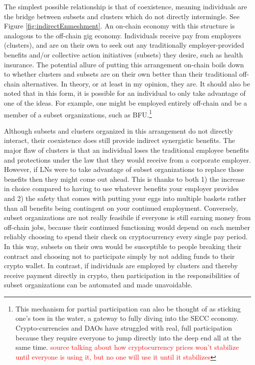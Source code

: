 \documentclass{article}[10pt]
\begin{document}
The simplest possible relationship is that of coexistence, meaning individuals are the bridge between subsets and clusters which do not directly intermingle. 
See Figure \ref{fig:indirectEnmeshment}. 
An on-chain economy with this structure is analogous to the off-chain gig economy.
Individuals receive pay from employers (clusters), and are on their own to seek out any traditionally employer-provided benefits and/or collective action initiatives (subsets) they desire, such as health insurance.
The potential allure of putting this arrangement on-chain boils down to whether clusters and subsets are on their own better than their traditional off-chain alternatives.
In theory, or at least in my opinion, they are.
It should also be noted that in this form, it is possible for an individual to only take advantage of one of the ideas.
For example, one might be employed entirely off-chain and be a member of a subset organizations, such as BFU.\footnote{
    This mechanism for partial participation can also be thought of as sticking one's toes in the water, a gateway to fully diving into the SECC economy.
    Crypto-currencies and DAOs have struggled with real, full participation because they require everyone to jump directly into the deep end all at the same time.
    \textcolor{red}{source talking about how cryptocurrency prices won't stabilize until everyone is using it, but no one will use it until it stabilizes}}\par

Although subsets and clusters organized in this arrangement do not directly interact, their coexistence does still provide indirect synergistic benefits.
The major flaw of clusters is that an individual loses the traditional employee benefits and protections under the law that they would receive from a corporate employer.
However, if LNs were to take advantage of subset organizations to replace those benefits then they might come out ahead.
This is thanks to both 1) the increase in choice compared to having to use whatever benefits your employer provides and 2) the safety that comes with putting your eggs into multiple baskets rather than all benefits being contingent on your continued employment.
Conversely, subset organizations are not really feasibile if everyone is still earning money from off-chain jobs, because their continued functioning would depend on each member reliably choosing to spend their check on cryptocurrency every single pay period.
In this way, subsets on their own would be susceptible to people breaking their contract and choosing not to participate simply by not adding funds to their crypto wallet.
In contrast, if individuals are employed by clusters and thereby receive payment directly in crypto, then participation in the responsibilities of subset organizations can be automated and made unavoidable.\par
\end{document}
